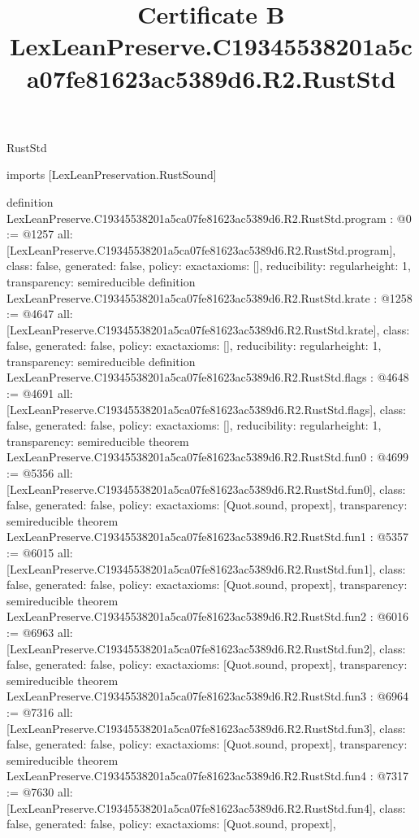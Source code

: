 \begin{lexlean}{RustStd}
\title{Certificate B LexLeanPreserve.C19345538201a5ca07fe81623ac5389d6.R2.RustStd}
\begin{coremodule}
imports [LexLeanPreservation.RustSound]

definition LexLeanPreserve.C19345538201a5ca07fe81623ac5389d6.R2.RustStd.program : @0 := @1257 {
  all: [LexLeanPreserve.C19345538201a5ca07fe81623ac5389d6.R2.RustStd.program],
  class: false,
  generated: false,
  policy: exact{axioms: []},
  reducibility: regular{height: 1},
  transparency: semireducible
}
definition LexLeanPreserve.C19345538201a5ca07fe81623ac5389d6.R2.RustStd.krate : @1258 := @4647 {
  all: [LexLeanPreserve.C19345538201a5ca07fe81623ac5389d6.R2.RustStd.krate],
  class: false,
  generated: false,
  policy: exact{axioms: []},
  reducibility: regular{height: 1},
  transparency: semireducible
}
definition LexLeanPreserve.C19345538201a5ca07fe81623ac5389d6.R2.RustStd.flags : @4648 := @4691 {
  all: [LexLeanPreserve.C19345538201a5ca07fe81623ac5389d6.R2.RustStd.flags],
  class: false,
  generated: false,
  policy: exact{axioms: []},
  reducibility: regular{height: 1},
  transparency: semireducible
}
theorem LexLeanPreserve.C19345538201a5ca07fe81623ac5389d6.R2.RustStd.fun0 : @4699 := @5356 {
  all: [LexLeanPreserve.C19345538201a5ca07fe81623ac5389d6.R2.RustStd.fun0],
  class: false,
  generated: false,
  policy: exact{axioms: [Quot.sound, propext]},
  transparency: semireducible
}
theorem LexLeanPreserve.C19345538201a5ca07fe81623ac5389d6.R2.RustStd.fun1 : @5357 := @6015 {
  all: [LexLeanPreserve.C19345538201a5ca07fe81623ac5389d6.R2.RustStd.fun1],
  class: false,
  generated: false,
  policy: exact{axioms: [Quot.sound, propext]},
  transparency: semireducible
}
theorem LexLeanPreserve.C19345538201a5ca07fe81623ac5389d6.R2.RustStd.fun2 : @6016 := @6963 {
  all: [LexLeanPreserve.C19345538201a5ca07fe81623ac5389d6.R2.RustStd.fun2],
  class: false,
  generated: false,
  policy: exact{axioms: [Quot.sound, propext]},
  transparency: semireducible
}
theorem LexLeanPreserve.C19345538201a5ca07fe81623ac5389d6.R2.RustStd.fun3 : @6964 := @7316 {
  all: [LexLeanPreserve.C19345538201a5ca07fe81623ac5389d6.R2.RustStd.fun3],
  class: false,
  generated: false,
  policy: exact{axioms: [Quot.sound, propext]},
  transparency: semireducible
}
theorem LexLeanPreserve.C19345538201a5ca07fe81623ac5389d6.R2.RustStd.fun4 : @7317 := @7630 {
  all: [LexLeanPreserve.C19345538201a5ca07fe81623ac5389d6.R2.RustStd.fun4],
  class: false,
  generated: false,
  policy: exact{axioms: [Quot.sound, propext]},
}
\end{coremodule}
\end{lexlean}
